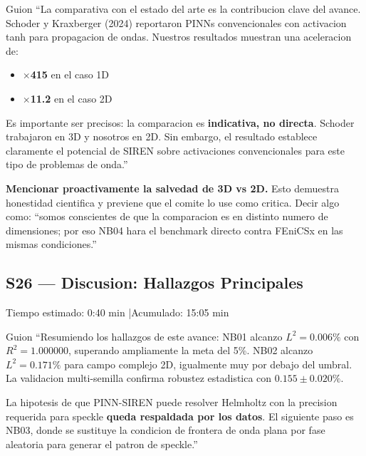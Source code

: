 \begin{slidebox}{Guion}
``La comparativa con el estado del arte es la contribucion clave del avance.
Schoder y Kraxberger (2024) reportaron PINNs convencionales con activacion tanh
para propagacion de ondas. Nuestros resultados muestran una aceleracion de:
\begin{itemize}
  \item \textbf{$\times$415} en el caso 1D
  \item \textbf{$\times$11.2} en el caso 2D
\end{itemize}
Es importante ser precisos: la comparacion es \textbf{indicativa, no directa}.
Schoder trabajaron en 3D y nosotros en 2D. Sin embargo, el resultado establece
claramente el potencial de SIREN sobre activaciones convencionales para este tipo
de problemas de onda.''
\end{slidebox}
\vspace{4pt}

\begin{tipbox}
\textbf{Mencionar proactivamente la salvedad de 3D vs 2D.} Esto demuestra honestidad
cientifica y previene que el comite lo use como critica. Decir algo como: ``somos
conscientes de que la comparacion es en distinto numero de dimensiones; por eso
NB04 hara el benchmark directo contra FEniCSx en las mismas condiciones.''
\end{tipbox}

\vspace{8pt}

\subsection{S26 --- Discusion: Hallazgos Principales}

\begin{timebox}
Tiempo estimado: 0:40 min \quad|\quad Acumulado: 15:05 min
\end{timebox}
\vspace{4pt}

\begin{slidebox}{Guion}
``Resumiendo los hallazgos de este avance: NB01 alcanzo $L^2 = 0.006\%$ con
$R^2 = 1.000000$, superando ampliamente la meta del 5\%. NB02 alcanzo $L^2 = 0.171\%$
para campo complejo 2D, igualmente muy por debajo del umbral. La validacion
multi-semilla confirma robustez estadistica con $0.155 \pm 0.020\%$.

La hipotesis de que PINN-SIREN puede resolver Helmholtz con la precision requerida
para speckle \textbf{queda respaldada por los datos}. El siguiente paso es NB03,
donde se sustituye la condicion de frontera de onda plana por fase aleatoria para
generar el patron de speckle.''
\end{slidebox}
\vspace{4pt}

